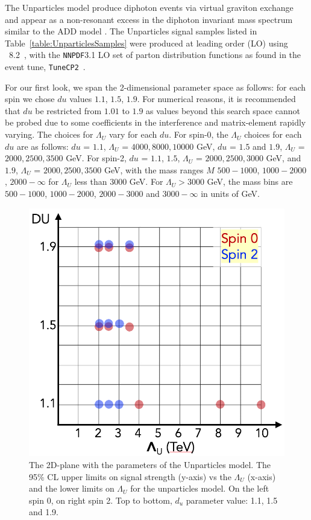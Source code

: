 The Unparticles model produce diphoton events via virtual graviton exchange and appear as a non-resonant excess in the diphoton invariant mass spectrum similar to the ADD model \cite{Ask:2009pv}. The Unparticles signal samples listed in Table~\ref{table:UnparticlesSamples} were produced at leading order (LO) using \PYTHIA~8.2~\cite{Sjostrand:2008za},
with the \texttt{NNPDF}3.1 LO set of parton distribution functions as found in the event tune, \texttt{TuneCP2}~\cite{Sirunyan:2019dfx}.

For our first look, we span the 2-dimensional parameter space as follows: for each spin we chose $du$ values $1.1$, $1.5$, $1.9$. For numerical reasons\cite{KumarEtal:2008}, it is recommended that $du$ be restricted from $1.01$ to $1.9$ as values beyond this search space cannot be probed due to some coefficients in the interference and matrix-element rapidly varying. The choices for $\Lambda_U$ vary for each $du$. For spin-0, the $\Lambda_U$ choices for each $du$ are as follows: $du$ = $1.1$, $\Lambda_U$ = $4000, 8000, 10000$ GeV, $du$ = $1.5$ and $1.9$, $\Lambda_U$ = $2000, 2500, 3500$ GeV. For spin-2, $du$ = $1.1$, $1.5$, $\Lambda_U$ = $2000, 2500, 3000$ GeV, and $1.9$, $\Lambda_U$ = $2000, 2500, 3500$ GeV, with the mass ranges $M$ $500-1000$, $1000-2000$, $2000-\infty$ for $\Lambda_U$ less than $3000$ GeV. For $\Lambda_U > 3000$ GeV, the mass bins are $500-1000$, $1000-2000$, $2000-3000$ and $3000-\infty$ in units of GeV.

\begin{figure}[!htbp]
	\centering
    \includegraphics[scale=0.3]{fig/Unpar_plane.png}
	\caption{The 2D-plane with the parameters of the Unparticles model.
The 95\% CL upper limits on signal strength (y-axis) vs the $\Lambda_U$ (x-axis) and the lower limits on $\Lambda_U$ for the unparticles model.
On the left spin 0, on right spin 2. Top to bottom, $d_{u}$ parameter value: 1.1, 1.5 and 1.9.}
	\label{fig:UnparticlesSearchSpace}
\end{figure}

